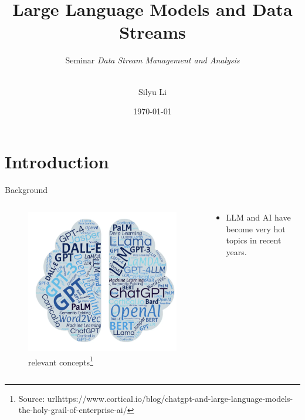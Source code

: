 \documentclass[t]{beamer}
\title{Large Language Models and Data Streams}
\subtitle{
  Seminar \textsl{Data Stream Management and Analysis}\\[1ex]
  \insertdate\\[1ex]
  \insertauthor
}
\date{\today}
\author{Silyu Li}
\institute{RWTH Aachen University}
\begin{document}
\begin{frame}[plain]
  \titlepage
\end{frame}


\section{Introduction}
\begin{frame}{Background}
  \begin{columns}
    \begin{column}{0.4\textwidth}
        \begin{figure}
            \centering
            \includegraphics[width=\textwidth]{llm1.png}
            \caption{relevant concepts\footnote{Source: url{https://www.cortical.io/blog/chatgpt-and-large-language-models-the-holy-grail-of-enterprise-ai/}}}
            \label{fig:llm1}
        \end{figure}
    \end{column}
    \begin{column}{0.5\textwidth}
        \begin{itemize}
            \item LLM and AI have become very hot topics in recent years.
        \end{itemize}
    \end{column}
\end{columns}
\end{frame}
\end{document}
